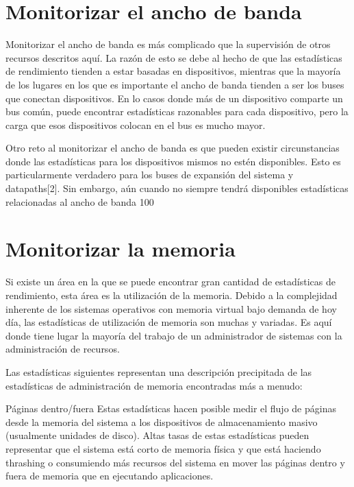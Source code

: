\documentclass[12pt]{article}
\begin{document}
\section*{Monitorizar el ancho de banda}
Monitorizar el ancho de banda es más complicado que la supervisión de otros recursos descritos aquí. La razón de esto se debe al hecho de que las estadísticas de rendimiento tienden a estar basadas en dispositivos, mientras que la mayoría de los lugares en los que es importante el ancho de banda tienden a ser los buses que conectan dispositivos. En lo casos donde más de un dispositivo comparte un bus común, puede encontrar estadísticas razonables para cada dispositivo, pero la carga que esos dispositivos colocan en el bus es mucho mayor.

Otro reto al monitorizar el ancho de banda es que pueden existir circunstancias donde las estadísticas para los dispositivos mismos no estén disponibles. Esto es particularmente verdadero para los buses de expansión del sistema y datapaths[2]. Sin embargo, aún cuando no siempre tendrá disponibles estadísticas relacionadas al ancho de banda 100%


\section*{Monitorizar la memoria}
Si existe un área en la que se puede encontrar gran cantidad de estadísticas de rendimiento, esta área es la utilización de la memoria. Debido a la complejidad inherente de los sistemas operativos con memoria virtual bajo demanda de hoy día, las estadísticas de utilización de memoria son muchas y variadas. Es aquí donde tiene lugar la mayoría del trabajo de un administrador de sistemas con la administración de recursos.

Las estadísticas siguientes representan una descripción precipitada de las estadísticas de administración de memoria encontradas más a menudo:

Páginas dentro/fuera
Estas estadísticas hacen posible medir el flujo de páginas desde la memoria del sistema a los dispositivos de almacenamiento masivo (usualmente unidades de disco). Altas tasas de estas estadísticas pueden representar que el sistema está corto de memoria física y que está haciendo thrashing o consumiendo más recursos del sistema en mover las páginas dentro y fuera de memoria que en ejecutando aplicaciones.
\end{document}
